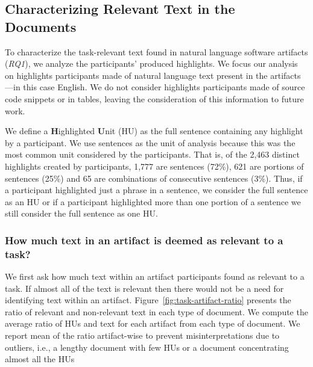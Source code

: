 \subsection{Characterizing Relevant Text in the Documents}




To characterize the task-relevant text found in natural language 
software artifacts (\textit{RQ1}), 
we analyze the participants' produced highlights.
We focus
our analysis on highlights participants made of natural language
text present in the artifacts---in this case English. We do not
consider highlights participants made of source code snippets or in
tables, leaving the consideration of this information to future work.



We define a \textbf{H}ighlighted \textbf{U}nit (HU) as the full sentence containing any
highlight by a participant. 
We use sentences as the unit of analysis 
because this was the most common unit considered by the participants.
That is, of the 2,463
distinct highlights created by participants, 1,777 are sentences
(72\%), 621 are portions of sentences (25\%) and 65 are combinations
of consecutive sentences (3\%). 
Thus, if a participant highlighted just a
phrase in a sentence, we consider the full sentence as an HU or if a
participant highlighted more than one portion of a sentence we still
consider the full sentence as one HU. 


\subsubsection{How much text in an artifact is deemed as relevant to a task?}
\label{cp3:ratio}



We first ask how much text within an artifact participants found as relevant to a task.
If almost all of the text is relevant then there would not be a need for
identifying text within an artifact.
Figure~\ref{fig:task-artifact-ratio} presents the ratio of relevant and non-relevant text in each type of document.
We compute the average ratio of HUs and text for each  artifact from each type of document.
We report mean of the ratio artifact-wise to prevent misinterpretations due to outliers,
i.e., a lengthy document with few HUs or a document concentrating almost all the HUs






